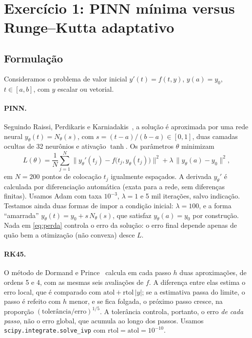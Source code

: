 
\section{Exercício 1: PINN mínima versus Runge--Kutta adaptativo}

\subsection{Formulação}

Consideramos o problema de valor inicial $y'(t) = f(t, y)$, $y(a) = y_0$, $t \in [a, b]$, com $y$ escalar ou vetorial.

\paragraph{PINN.} Seguindo Raissi, Perdikaris e Karniadakis~\cite{raissi2019}, a solução é aproximada por uma rede neural $y_\theta(t) = N_\theta(s)$, com $s = (t-a)/(b-a) \in [0,1]$,
duas camadas ocultas de 32 neurônios e ativação $\tanh$. Os parâmetros $\theta$ minimizam
\begin{equation}
  L(\theta) = \frac{1}{N}\sum_{j=1}^{N} \big\| y_\theta'(t_j) - f\big(t_j, y_\theta(t_j)\big) \big\|^2
            + \lambda\, \big\| y_\theta(a) - y_0 \big\|^2 ,
  \label{eq:perda}
\end{equation}
em $N = 200$ pontos de colocação $t_j$ igualmente espaçados. A derivada $y_\theta'$ é calculada por diferenciação
automática (exata para a rede, sem diferenças finitas). Usamos Adam com taxa $10^{-3}$, $\lambda = 1$ e 5 mil iterações,
salvo indicação. Testamos ainda duas formas de impor a condição inicial: $\lambda = 100$, e a forma ``amarrada''
$y_\theta(t) = y_0 + s\,N_\theta(s)$, que satisfaz $y_\theta(a) = y_0$ por construção. Nada em \eqref{eq:perda} controla
o erro da solução: o erro final depende apenas de quão bem a otimização (não convexa) desce $L$.

\paragraph{RK45.} O método de Dormand e Prince~\cite{dormand1980} calcula em cada passo $h$ duas aproximações, de ordens 5 e 4, com as mesmas
seis avaliações de $f$. A diferença entre elas estima o erro local, que é comparado com
$\mathrm{atol} + \mathrm{rtol}\,|y|$; se a estimativa passa do limite, o passo é refeito com $h$ menor, e se fica folgada,
o próximo passo cresce, na proporção $(\text{tolerância}/\text{erro})^{1/5}$. A tolerância controla, portanto, o erro
\emph{de cada passo}, não o erro global, que acumula ao longo dos passos. Usamos \texttt{scipy.integrate.solve\_ivp}
com $\mathrm{rtol} = \mathrm{atol} = 10^{-10}$.

